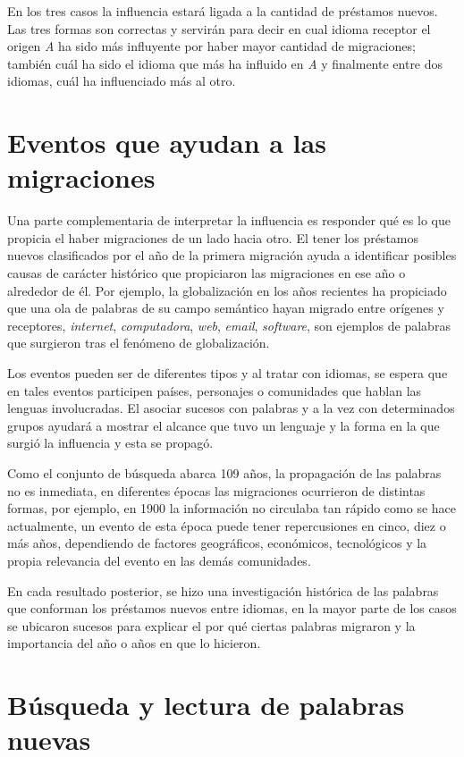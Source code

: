 En los tres casos la influencia estará ligada a la cantidad de préstamos
nuevos.  Las tres formas son correctas y servirán para decir en cual idioma
receptor  el origen \textit{A} ha sido más influyente por haber mayor cantidad
de migraciones; también cuál ha sido el idioma  que más ha influido en
\textit{A} y finalmente entre dos idiomas,  cuál ha influenciado más al otro. 
\section{Eventos que ayudan a las migraciones} %

Una parte complementaria de interpretar la influencia es responder qué es lo
que propicia el haber migraciones de un lado hacia otro.  El tener los
préstamos nuevos clasificados por el año de la primera migración ayuda a
identificar posibles causas de carácter histórico que propiciaron las
migraciones en ese año o alrededor de él.  Por ejemplo, la globalización en los
años recientes ha propiciado que una ola de palabras de su campo semántico
hayan migrado entre orígenes y receptores,  \textit{internet},
\textit{computadora}, \textit{web}, \textit{email},  \textit{software}, son
ejemplos de palabras que surgieron tras el fenómeno de globalización. 

Los eventos pueden ser de diferentes tipos y al tratar con idiomas, se espera
que en tales eventos participen países, personajes o  comunidades que hablan
las lenguas involucradas.  El asociar sucesos con palabras y a la vez con
determinados grupos ayudará a mostrar el alcance que tuvo un lenguaje y la
forma en la que surgió la influencia y esta se propagó. 

Como el conjunto de búsqueda abarca 109 años,  la propagación de las palabras
no es inmediata, en diferentes épocas las migraciones ocurrieron de distintas
formas,  por ejemplo, en 1900 la información no circulaba tan rápido como se
hace actualmente, un evento de esta época puede tener repercusiones en cinco,
diez o más años,  dependiendo de factores geográficos, económicos, tecnológicos
y  la  propia relevancia del evento en las demás comunidades.

En cada resultado posterior, se hizo una investigación histórica de las
palabras que conforman los préstamos nuevos entre idiomas,  en la mayor parte
de los casos se ubicaron sucesos para explicar el por qué ciertas palabras
migraron y la importancia del año o años en que lo hicieron. 

\section{Búsqueda y lectura de palabras nuevas} %

